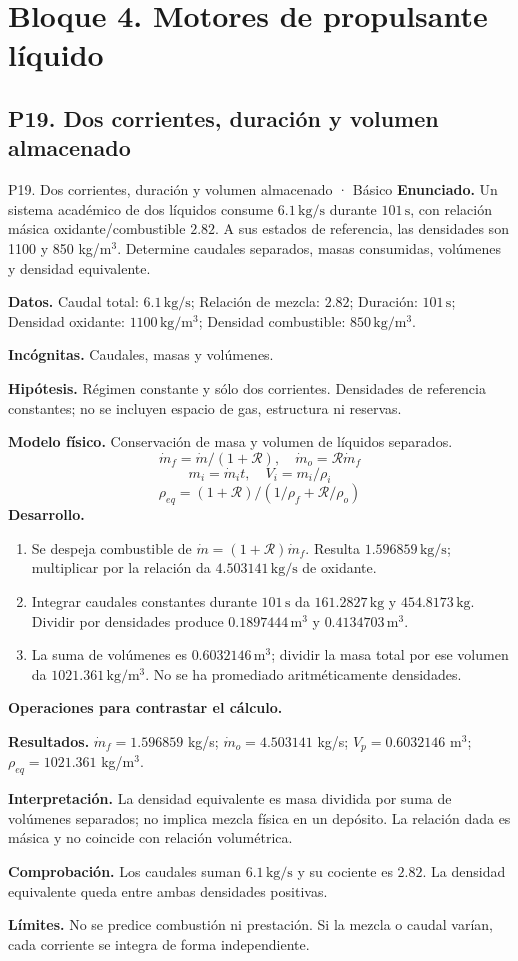 \chapter{Bloque 4. Motores de propulsante líquido}
\section{P19. Dos corrientes, duración y volumen almacenado}
\begin{studiumworked}{P19. Dos corrientes, duración y volumen almacenado · Básico}
\textbf{Enunciado.} Un sistema académico de dos líquidos consume $6.1\,\mathrm{kg/s}$ durante $101\,\mathrm{s}$, con relación másica oxidante/combustible $2.82$. A sus estados de referencia, las densidades son 1100 y 850 kg/m$^3$. Determine caudales separados, masas consumidas, volúmenes y densidad equivalente.

\textbf{Datos.} Caudal total: $6.1\,\mathrm{kg/s}$; Relación de mezcla: $2.82$; Duración: $101\,\mathrm{s}$; Densidad oxidante: $1100\,\mathrm{kg/m^3}$; Densidad combustible: $850\,\mathrm{kg/m^3}$.

\textbf{Incógnitas.} Caudales, masas y volúmenes.

\textbf{Hipótesis.} Régimen constante y sólo dos corrientes. Densidades de referencia constantes; no se incluyen espacio de gas, estructura ni reservas.

\textbf{Modelo físico.} Conservación de masa y volumen de líquidos separados.
\[\dot m_f=\dot m/(1+\mathcal R),\quad \dot m_o=\mathcal R\dot m_f\]
\[m_i=\dot m_it,\quad V_i=m_i/\rho_i\]
\[\rho_{eq}=(1+\mathcal R)/(1/\rho_f+\mathcal R/\rho_o)\]
\textbf{Desarrollo.}
\begin{enumerate}
\item Se despeja combustible de $\dot m=(1+\mathcal R)\dot m_f$. Resulta $1.596859\,\mathrm{kg/s}$; multiplicar por la relación da $4.503141\,\mathrm{kg/s}$ de oxidante.
\item Integrar caudales constantes durante $101\,\mathrm{s}$ da $161.2827\,\mathrm{kg}$ y $454.8173\,\mathrm{kg}$. Dividir por densidades produce $0.1897444\,\mathrm{m^3}$ y $0.4134703\,\mathrm{m^3}$.
\item La suma de volúmenes es $0.6032146\,\mathrm{m^3}$; dividir la masa total por ese volumen da $1021.361\,\mathrm{kg/m^3}$. No se ha promediado aritméticamente densidades.
\end{enumerate}
\textbf{Operaciones para contrastar el cálculo.}

\textbf{Resultados.} $\dot m_f=1.596859$ kg/s; $\dot m_o=4.503141$ kg/s; $V_p=0.6032146$ m$^3$; $\rho_{eq}=1021.361$ kg/m$^3$.

\textbf{Interpretación.} La densidad equivalente es masa dividida por suma de volúmenes separados; no implica mezcla física en un depósito. La relación dada es másica y no coincide con relación volumétrica.

\textbf{Comprobación.} Los caudales suman $6.1\,\mathrm{kg/s}$ y su cociente es $2.82$. La densidad equivalente queda entre ambas densidades positivas.

\textbf{Límites.} No se predice combustión ni prestación. Si la mezcla o caudal varían, cada corriente se integra de forma independiente.
\end{studiumworked}
